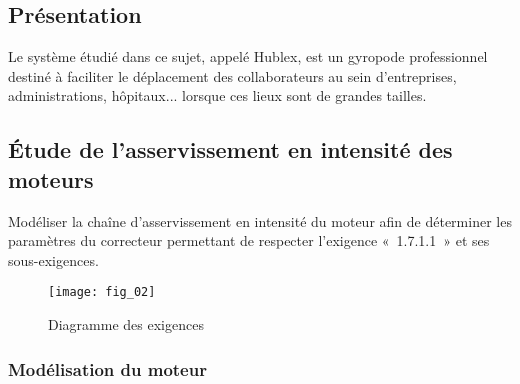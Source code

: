 \ifprof
\else
\begin{multicols}{2}
\fi

\subsection*{Présentation}
\ifprof
\else

Le système étudié dans ce sujet, appelé Hublex, est un gyropode professionnel destiné à faciliter le déplacement des collaborateurs au sein d’entreprises, administrations, hôpitaux... lorsque ces lieux sont de grandes tailles.
\fi

\subsection*{Étude de l’asservissement en intensité des moteurs}
\ifprof
\else

\begin{obj}
Modéliser la chaîne d’asservissement en intensité du moteur afin de déterminer les paramètres du correcteur permettant de respecter l’exigence «~1.7.1.1~» et ses sous-exigences.
\end{obj}

\begin{figure}[H]
\centering
\texttt{[image: fig\_02]}
\caption{Diagramme des exigences \label{fig_02}}
\end{figure}
\fi


\subsubsection*{Modélisation du moteur}

\ifprof
\else


\end{multicols}

